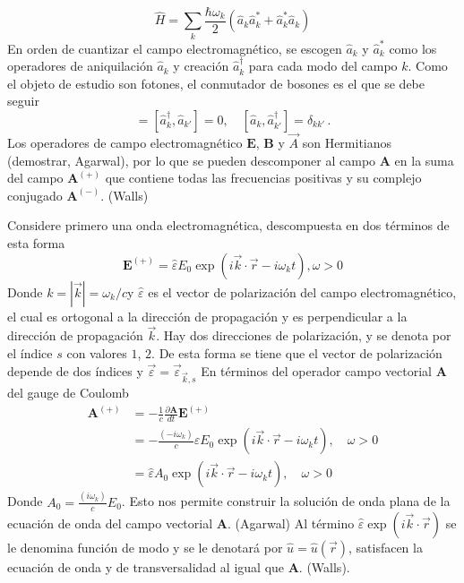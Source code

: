 \begin{equation}
  \label{EM.22}
  \hat{H} = \sum_{k} \frac{\hbar\omega_{k}}{2}\left(\hat{a}_{k}\hat{a}^{*}_{k} + \hat{a}_{k}^{*} \hat{a}_{k} \right)
\end{equation}
En orden de cuantizar el campo electromagnético, se escogen $\hat{a}_{k}$ y $\hat{a}^{*}_{k}$ como los operadores de aniquilaci\'on $\hat{a}_{k}$ y creaci\'on $\hat{a}^{\dagger}_{k}$ para cada modo del campo $k$. Como el objeto de estudio son fotones, el conmutador de bosones es el que se debe seguir
\begin{equation}
  [\hat{a}_k, \hat{a}^{\dagger}_{k'}] = [\hat{a}^{\dagger}_k, \hat{a}_{k'}] = 0, \quad [\hat{a}_k, \hat{a}_{k'}^{\dagger}] = \delta_{kk'} \,.
\end{equation}
\iffalse
  Los operadores de campo electromagnético $\mathbf{E}$, $\mathbf{B}$ y $\vec{A}$ son Hermitianos (demostrar, Agarwal), por lo que se pueden descomponer al campo $\mathbf{A}$ en la suma del campo $\mathbf{A}^{(+)}$ que contiene todas las frecuencias positivas  y su complejo conjugado $\mathbf{A}^{(-)}$. (Walls)

  Considere primero una onda electromagnética, descompuesta en dos términos de esta forma
  \begin{equation}
    \mathbf{E}^{(+)} = \hat{\varepsilon} E_0 \exp{\left(i\vec{k}\cdot \vec{r} - i\omega_k t\right)}, \omega > 0
  \end{equation}
  Donde $k = |\vec{k}| = \omega_k/c$y $\hat{\varepsilon}$ es el vector de polarización del campo electromagnético, el cual es ortogonal a la dirección de propagación y es perpendicular a la dirección de propagación $\vec{k}$. Hay dos direcciones de polarización, y se denota por el índice $s$ con valores $1$, $2$. De esta forma se tiene que el vector de polarización depende de dos índices y $\vec{\varepsilon} = \vec{\varepsilon}_{\vec{k},s}$ En términos del operador campo vectorial $\mathbf{A}$ del gauge de Coulomb
  \begin{align}
    \mathbf{A}^{(+)} & = -\frac{1}{c}\frac{\partial \mathbf{A}}{dt} \mathbf{E}^{(+)}                                                           \\
                     & = -\frac{(-i\omega_k)}{c}\hat{\varepsilon} E_0 \exp{\left(i\vec{k}\cdot \vec{r} - i\omega_k t\right)}, \quad \omega > 0 \\
                     & = \hat{\varepsilon} A_0 \exp{\left(i\vec{k}\cdot \vec{r} - i\omega_k t\right)}, \quad \omega > 0
  \end{align}
  Donde $A_0=\frac{(i\omega_k)}{c}E_0$. Esto nos permite construir la solución de onda plana de la ecuación de onda del campo vectorial $\mathbf{A}$. (Agarwal) Al término $\hat{\varepsilon} \exp{\left(i\vec{k}\cdot \vec{r}\right)}$ se le denomina función de modo y se le denotará por $\hat{u} = \hat{u}(\vec{r})$, satisfacen la ecuación de onda y de transversalidad al igual que $\mathbf{A}$. (Walls).


